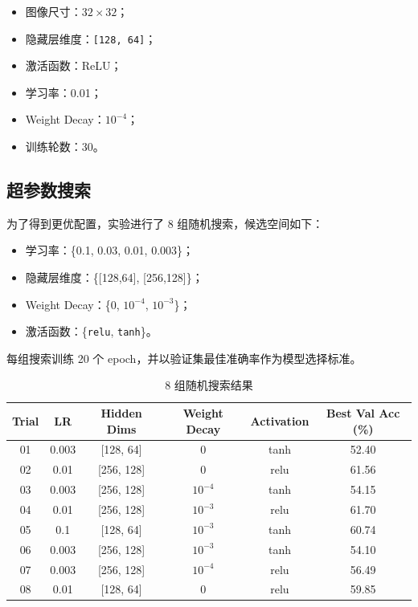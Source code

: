 \documentclass[12pt,a4paper,fontset=none]{ctexart}
\begin{document}
\begin{itemize}
    \item 图像尺寸：$32 \times 32$；
    \item 隐藏层维度：\texttt{[128, 64]}；
    \item 激活函数：ReLU；
    \item 学习率：0.01；
    \item Weight Decay：$10^{-4}$；
    \item 训练轮数：30。
\end{itemize}

\subsection{超参数搜索}

为了得到更优配置，实验进行了 8 组随机搜索，候选空间如下：

\begin{itemize}
    \item 学习率：\{0.1, 0.03, 0.01, 0.003\}；
    \item 隐藏层维度：\{[128,64], [256,128]\}；
    \item Weight Decay：\{0, $10^{-4}$, $10^{-3}$\}；
    \item 激活函数：\{\texttt{relu}, \texttt{tanh}\}。
\end{itemize}

每组搜索训练 20 个 epoch，并以验证集最佳准确率作为模型选择标准。

\begin{table}[htbp]
\centering
\small
\begin{tabular}{|c|c|c|c|c|c|}
\hline
Trial & LR & Hidden Dims & Weight Decay & Activation & Best Val Acc (\%) \\
\hline
01 & 0.003 & [128, 64] & 0 & tanh & 52.40 \\
02 & 0.01 & [256, 128] & 0 & relu & 61.56 \\
03 & 0.003 & [256, 128] & $10^{-4}$ & tanh & 54.15 \\
04 & 0.01 & [256, 128] & $10^{-3}$ & relu & 61.70 \\
05 & 0.1 & [128, 64] & $10^{-3}$ & tanh & 60.74 \\
06 & 0.003 & [256, 128] & $10^{-3}$ & tanh & 54.10 \\
07 & 0.003 & [256, 128] & $10^{-4}$ & relu & 56.49 \\
08 & 0.01 & [128, 64] & 0 & relu & 59.85 \\
\hline
\end{tabular}
\caption{8 组随机搜索结果}
\label{tab:search_results}
\end{table}
\end{document}
